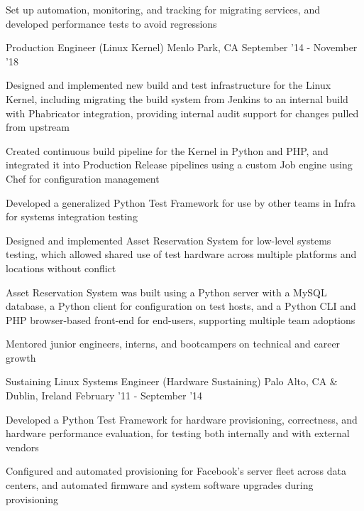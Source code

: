 \begin{cventries}
{\begin{cvitems}
		  \item Set up automation, monitoring, and tracking for migrating services, and developed performance tests to avoid regressions
        \end{cvitems}
    }
\vspace{0mm}
\cventry
	{Production Engineer \color{solarized-orange}(Linux Kernel)} %
    {} %
    {Menlo Park, CA} %
    {September '14 - November '18} %
    {
        \begin{cvitems}
		  \item Designed and implemented new build and test infrastructure for the Linux Kernel, including migrating the build system from Jenkins to an internal build with Phabricator integration, providing internal audit support for changes pulled from upstream
		  \item Created continuous build pipeline for the Kernel in Python and PHP, and integrated it into Production Release pipelines using a custom Job engine using Chef for configuration management
		  \item Developed a generalized Python Test Framework for use by other teams in Infra for systems integration testing
		  \item Designed and implemented Asset Reservation System for low-level systems testing, which allowed shared use of test hardware across multiple platforms and locations without conflict
		  \item Asset Reservation System was built using a Python server with a MySQL database, a Python client for configuration on test hosts, and a Python CLI and PHP browser-based front-end for end-users, supporting multiple team adoptions
          \item Mentored junior engineers, interns, and bootcampers on technical and career growth
        \end{cvitems}
    }
\vspace{0mm}
\cventry
	{Sustaining Linux Systems Engineer \color{solarized-orange}(Hardware Sustaining)} %
    {} %
	{Palo Alto, CA \& Dublin, Ireland} %
    {February '11 - September '14} %
    {
        \begin{cvitems}
		  \item Developed a Python Test Framework for hardware provisioning, correctness, and hardware performance evaluation, for testing both internally and with external vendors
		  \item Configured and automated provisioning for Facebook's server fleet across data centers, and automated firmware and system software upgrades during provisioning

\end{cvitems}}
\end{cventries}
